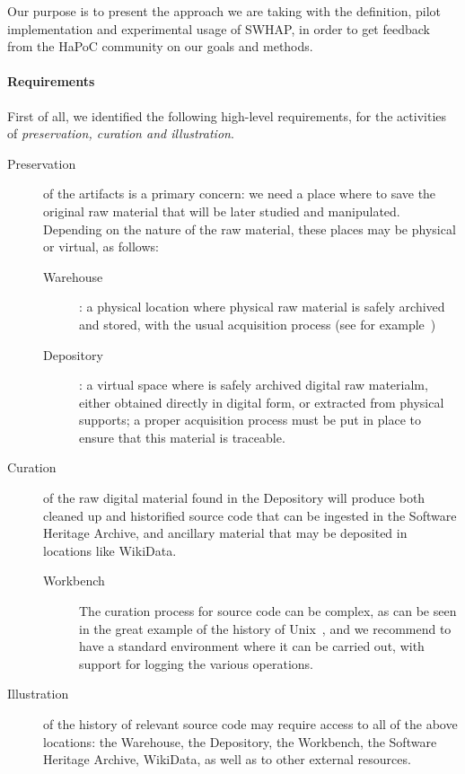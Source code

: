 \documentclass[a4paper]{article}
\begin{document}
\noindent
Our purpose is to present the approach we are taking with the definition, pilot implementation and experimental usage of SWHAP, in order to get feedback from the HaPoC community on our goals and methods. 

\paragraph{Requirements}
First of all, we identified the following high-level requirements, for the activities of \emph{preservation, curation and illustration}.



\begin{description}
	\item[Preservation] of the artifacts is a primary concern: we need a place where to save the original raw material that will be later studied and manipulated. Depending on the nature of the raw material, these places may be physical or virtual, as follows:
	\begin{description}
		\item[Warehouse]: a physical location where physical raw material is safely archived and stored, with the usual acquisition process (see for example~\cite{Spectrum})
		\item[Depository]: a virtual space where is safely archived digital raw materialm, either obtained directly in digital form, or extracted from physical supports; a proper acquisition process must be put in place to ensure that this material is traceable.
        \end{description}
      \item[Curation] of the raw digital material found in the Depository will produce both cleaned up and historified source code that can be ingested in the Software Heritage Archive, and ancillary material that may be deposited in locations like WikiData.
        \begin{description}
          \item[Workbench] The curation process for source code can be complex, as can be seen in the great example of the history of Unix~\cite{Spi16g}, and we recommend to have a standard environment where it can be carried out, with support for logging the various operations.
        \end{description}
      \item[Illustration] of the history of relevant source code may require access to all of the above locations: the Warehouse, the Depository, the Workbench, the Software Heritage Archive, WikiData, as well as to other external resources.
\end{description}
\end{document}

